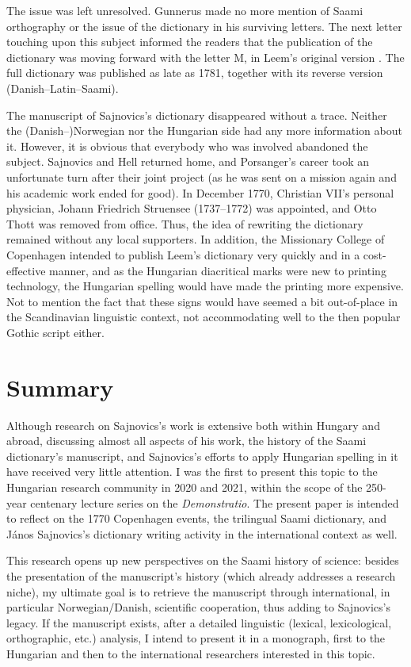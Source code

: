 \documentclass[output=paper,colorlinks,citecolor=brown,arabicfont,chinesefont]{langscibook}
\begin{document}
The issue was left unresolved. Gunnerus made no more mention of Saami orthography or the issue of the dictionary in his surviving letters. The next letter touching upon this subject informed the readers that the publication of the dictionary was moving forward with the letter M, in Leem’s original version \citet[54]{Dahl1906}. The full dictionary was published as late as 1781, together with its reverse version (Danish–Latin–Saami).

The manuscript of Sajnovics’s dictionary disappeared without a trace. Neither the (Danish–)Norwegian nor the Hungarian side had any more information about it. However, it is obvious that everybody who was involved abandoned the subject. Sajnovics and Hell returned home, and Porsanger’s career took an unfortunate turn after their joint project (as he was sent on a mission again and his academic work ended for good). In December 1770,  Christian VII’s personal physician, Johann Friedrich Struensee (1737–1772) was appointed, and Otto Thott was removed from office. Thus, the idea of rewriting the dictionary remained without any local supporters. In addition, the Missionary College of Copenhagen intended to publish Leem’s dictionary very quickly and in a cost-effective manner, and as the Hungarian diacritical marks were new to printing technology, the Hungarian spelling would have made the printing more expensive. Not to mention the fact that these signs would have seemed a bit out-of-place in the Scandinavian linguistic context, not accommodating well to the then popular Gothic script either.

\section{Summary}

Although research on Sajnovics’s work is extensive both within Hungary and abroad, discussing almost all aspects of his work, the history of the Saami dictionary’s manuscript, and Sajnovics’s efforts to apply Hungarian spelling in it have received very little attention. I was the first to present this topic to the Hungarian research community in 2020 and 2021, within the scope of the 250-year centenary lecture series on the \emph{Demonstratio}. The present paper is intended to reflect on the 1770 Copenhagen events, the trilingual Saami dictionary, and János Sajnovics’s dictionary writing activity in the international context as well.

This research opens up new perspectives on the Saami history of science: besides the presentation of the manuscript’s history (which already addresses a research niche), my ultimate goal is to retrieve the manuscript through international, in particular Norwegian/Danish, scientific cooperation, thus adding to Sajnovics’s legacy. If the manuscript exists, after a detailed linguistic (lexical, lexicological, orthographic, etc.) analysis, I intend to present it in a monograph, first to the Hungarian and then to the international researchers interested in this topic. 

{\sloppy\printbibliography[heading=subbibliography,notkeyword=this]}
\end{document}
